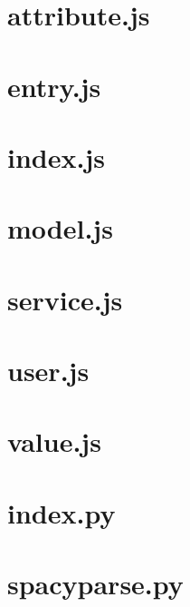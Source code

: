 \documentclass[a4paper,landscape]{report}
\begin{document}
\newpage
\section{attribute.js}


\newpage
\section{entry.js}


\newpage
\section{index.js}


\newpage
\section{model.js}


\newpage
\section{service.js}


\newpage
\section{user.js}


\newpage
\section{value.js}


\newpage
\section{index.py}


\newpage
\section{spacyparse.py}

\end{document}
